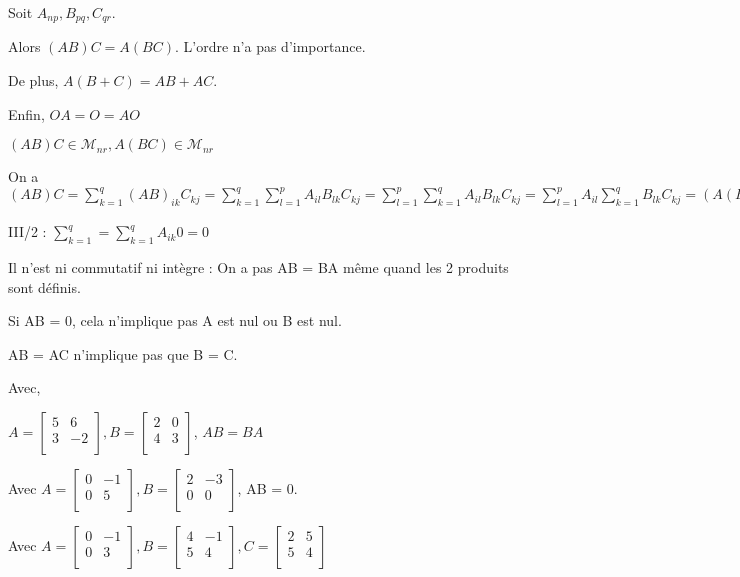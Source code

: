 \documentclass[french]{yLectureNote}
\newcommand{\mc}{\mathcal}
\begin{document}
\begin{proposition}
Soit \(A_{np}, B_{pq}, C_{qr}\).

Alors \((AB)C=A(BC)\). L'ordre n'a pas d'importance.

De plus, \(A(B+C) = AB+AC\).

Enfin, \(OA = O = AO\)
\end{proposition}
\begin{myproof}
 \((AB)C \in \mc{M}_{nr}, A(BC)\in \mc{M}_{nr}\)

 On a \((AB)C = \sum^q_{k=1} (AB)_{ik}C_{kj} = \sum^q_{k=1} \sum^p_{l=1} A_{il}B_{lk}C_{kj} = \sum^p_{l=1} \sum^q_{k=1} A_{il}B_{lk}C_{kj} = \sum^p_{l=1} A_{il} \sum^q_{k=1} B_{lk}C_{kj} = (A(BC))_{ij} \)

 III/2 : \(\sum^q_{k=1} = \sum^q_{k=1} A_{ik} 0 = 0\)
\end{myproof}
\begin{proposition}
Il n'est ni commutatif ni intègre : On a pas AB = BA m\^eme quand les 2 produits sont définis.

Si AB = 0, cela n'implique pas A est nul ou B est nul.

AB = AC n'implique pas que B = C.
\end{proposition}
Avec,
\begin{myproof}
 \(A = \begin{bmatrix}
 5& 6 \\
 3&-2 \\
\end{bmatrix}, B = \begin{bmatrix}
 2&0 \\
 4&3 \\
\end{bmatrix}\), \(AB=BA\)

Avec \(A = \begin{bmatrix}
 0&-1 \\
 0&5 \\
\end{bmatrix}, B = \begin{bmatrix}
 2&-3 \\
 0&0 \\
\end{bmatrix}\), AB = 0.

Avec
\(A = \begin{bmatrix}
 0& -1 \\
 0&3 \\
\end{bmatrix}, B = \begin{bmatrix}
 4&-1 \\
 5&4 \\
\end{bmatrix}, C = \begin{bmatrix}
 2&5 \\
 5&4 \\
\end{bmatrix}\)
\end{myproof}
\end{document}
